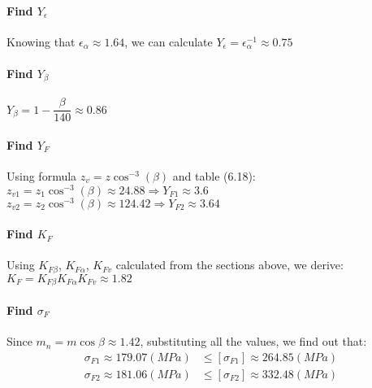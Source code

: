 \paragraph{Find $ Y_\epsilon $} Knowing that $ \epsilon_\alpha \approx 1.64 $, we can calculate $ Y_\epsilon = \epsilon_\alpha^{-1} \approx 0.75 $
\paragraph{Find $ Y_\beta $} $ Y_\beta = 1-\dfrac{\beta}{140}\approx0.86$
\paragraph{Find $ Y_F $} Using formula $ z_v = z\cos^{-3}(\beta) $ and table (6.18):\\
$ z_{v1} = z_1\cos^{-3}(\beta) \approx 24.88 \Rightarrow Y_{F1} \approx 3.6$\\
$ z_{v2} = z_2\cos^{-3}(\beta) \approx 124.42 \Rightarrow Y_{F2} \approx 3.64 $
\paragraph{Find $ K_F $}
Using $ K_{F\beta} $, $ K_{F\alpha} $, $ K_{Fv} $ calculated from the sections above, we derive:\\ $ K_F = K_{F\beta}K_{F\alpha}K_{Fv} \approx 1.82 $
\paragraph{Find $ \sigma_F $} Since $ m_n = m\cos\beta \approx 1.42$, substituting all the values, we find out that:
\begin{align*}
	\sigma_{F1} \approx 179.07\unit{(MPa)} & \leq [\sigma_{F1}]\approx264.85\unit{(MPa)}\\
	\sigma_{F2} \approx 181.06\unit{(MPa)} & \leq [\sigma_{F2}]\approx332.48\unit{(MPa)}
\end{align*}

